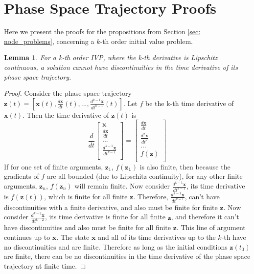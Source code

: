 \documentclass{article}
\newtheorem{lemma}[theorem]{Lemma}
\theoremstyle{remark}
\theoremstyle{definition}
\begin{document}



\newpage
\appendix


\section{Phase Space Trajectory Proofs}
\label{app: ode_proofs}
Here we present the proofs for the propositions from Section \ref{sec: node_problems}, concerning a $k$-th order initial value problem.

\begin{lemma}
\label{lem: no_kink}
For a k-th order IVP, where the k-th derivative is Lipschitz continuous, a solution cannot have discontinuities in the time derivative of its phase space trajectory.
\end{lemma}

\begin{proof}
Consider the phase space trajectory $\displaystyle \mathbf{z}(t) = \left[\mathbf{x}(t), \frac{d\mathbf{x}}{dt}(t), ... , \frac{d^{k-1}\mathbf{x}}{dt^{k-1}}(t) \right]$. Let $f$ be the k-th time derivative of $\mathbf{x}(t)$. Then the time derivative of $\mathbf{z}(t)$ is
\[
\frac{d}{dt}
\begin{bmatrix}
\mathbf{x}\\[5pt]
\displaystyle \frac{d\mathbf{x}}{dt}\\
...\\
\displaystyle \frac{d^{k-1}\mathbf{x}}{dt^{k-1}}\\
\end{bmatrix}
=
\begin{bmatrix}
\displaystyle \frac{d\mathbf{x}}{dt}\\[7pt]
\displaystyle \frac{d^{2}\mathbf{x}}{dt^{2}}\\
...\\
f(\mathbf{z})\\
\end{bmatrix}
\]
If for one set of finite arguments, $\mathbf{z}_{1}$, $f(\mathbf{z_{1}})$ is also finite, then because the gradients of $f$ are all bounded (due to Lipschitz continuity), for any other finite arguments, $\mathbf{z}_{n}$, $f(\mathbf{z}_{n})$ will remain finite. Now consider $\displaystyle  \frac{d^{k-1}\mathbf{x}}{dt^{k-1}}$, its time derivative is $f(\mathbf{z}(t))$, which is finite for all finite $\mathbf{z}$. Therefore, $\displaystyle  \frac{d^{k-1}\mathbf{x}}{dt^{k-1}}$, can't have discontinuities with a finite derivative, and also must be finite for finite $\mathbf{z}$. Now consider $\displaystyle  \frac{d^{k-2}\mathbf{x}}{dt^{k-2}}$, its time derivative is finite for all finite $\mathbf{z}$, and therefore it can't have discontinuities and also must be finite for all finite $\mathbf{z}$. This line of argument continues up to $\mathbf{x}$. The state $\mathbf{x}$ and all of its time derivatives up to the $k$-th have no discontinuities and are finite. Therefore as long as the initial conditions $\mathbf{z}(t_{0})$ are finite, there can be no discontinuities in the time derivative of the phase space trajectory at finite time.
\end{proof}
\end{document}
